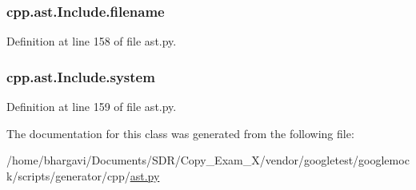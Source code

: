 \subsubsection[{\texorpdfstring{filename}{filename}}]{\setlength{\rightskip}{0pt plus 5cm}cpp.\+ast.\+Include.\+filename}\hypertarget{classcpp_1_1ast_1_1_include_a9ecff64f127655d3c17e9abe4ebe3852}{}\label{classcpp_1_1ast_1_1_include_a9ecff64f127655d3c17e9abe4ebe3852}


Definition at line 158 of file ast.\+py.

\subsubsection[{\texorpdfstring{system}{system}}]{\setlength{\rightskip}{0pt plus 5cm}cpp.\+ast.\+Include.\+system}\hypertarget{classcpp_1_1ast_1_1_include_a2e8e535b1af7d9b0ff94d0ae9f86e5c5}{}\label{classcpp_1_1ast_1_1_include_a2e8e535b1af7d9b0ff94d0ae9f86e5c5}


Definition at line 159 of file ast.\+py.



The documentation for this class was generated from the following file\+:\begin{DoxyCompactItemize}
\item 
/home/bhargavi/\+Documents/\+S\+D\+R/\+Copy\+\_\+\+Exam\+\_\+X/vendor/googletest/googlemock/scripts/generator/cpp/\hyperlink{ast_8py}{ast.\+py}\end{DoxyCompactItemize}
